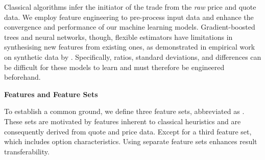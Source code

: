 Classical algorithms infer the initiator of the trade from the \emph{raw} price and quote data. We employ feature engineering to pre-process input data and enhance the convergence and performance of our machine learning models. Gradient-boosted trees and neural networks, though, flexible estimators have limitations in synthesising new features from existing ones, as demonstrated in empirical work on synthetic data by \textcite[][5--6]{heatonEmpiricalAnalysisFeature2016}. Specifically, ratios, standard deviations, and differences can be difficult for these models to learn and must therefore be engineered beforehand.

\textbf{Features and Feature Sets}

To establish a common ground, we define three feature sets, abbreviated as . These sets are motivated by features inherent to classical heuristics and are consequently derived from quote and price data. Except for a third feature set, which includes option characteristics. Using separate feature sets enhances result transferability.

